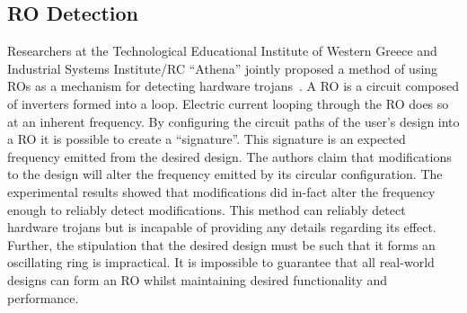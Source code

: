 \subsection{\acrfull{RO} Detection}
Researchers at the Technological Educational Institute of Western Greece and Industrial Systems Institute/RC “Athena” jointly proposed a method of using \acrfull{ROs} as a mechanism for detecting hardware trojans~\cite{ringOscillatorMethod}.
A \acrshort{RO} is a circuit composed of inverters formed into a loop.
Electric current looping through the \acrshort{RO} does so at an inherent frequency.
By configuring the circuit paths of the user's design into a \acrshort{RO} it is possible to create a ``signature''.
This signature is an expected frequency emitted from the desired design. 
The authors claim that modifications to the design will alter the frequency emitted by its circular configuration.
The experimental results showed that modifications did in-fact alter the frequency enough to reliably detect modifications.
This method can reliably detect hardware trojans but is incapable of providing any details regarding its effect.
Further, the stipulation that the desired design must be such that it forms an oscillating ring is impractical.
It is impossible to guarantee that all real-world designs can form an \acrshort{RO} whilst maintaining desired functionality and performance.
